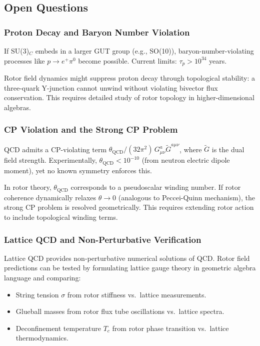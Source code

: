 \documentclass[11pt,a4paper]{article}
\theoremstyle{definition}
\theoremstyle{plain}
\theoremstyle{remark}
\begin{document}
\subsection{Open Questions}

\subsubsection{Proton Decay and Baryon Number Violation}

If SU(3)$_C$ embeds in a larger GUT group (e.g., SO(10)), baryon-number-violating processes like $p \to e^+ \pi^0$ become possible. Current limits: $\tau_p > 10^{34}$ years.

Rotor field dynamics might suppress proton decay through topological stability: a three-quark Y-junction cannot unwind without violating bivector flux conservation. This requires detailed study of rotor topology in higher-dimensional algebras.

\subsubsection{CP Violation and the Strong CP Problem}

QCD admits a CP-violating term $\theta_{\mathrm{QCD}}/(32\pi^2)\,G_{\mu\nu}^a \tilde{G}^{a\mu\nu}$, where $\tilde{G}$ is the dual field strength. Experimentally, $\theta_{\mathrm{QCD}} < 10^{-10}$ (from neutron electric dipole moment), yet no known symmetry enforces this.

In rotor theory, $\theta_{\mathrm{QCD}}$ corresponds to a pseudoscalar winding number. If rotor coherence dynamically relaxes $\theta \to 0$ (analogous to Peccei-Quinn mechanism), the strong CP problem is resolved geometrically. This requires extending rotor action to include topological winding terms.

\subsubsection{Lattice QCD and Non-Perturbative Verification}

Lattice QCD provides non-perturbative numerical solutions of QCD. Rotor field predictions can be tested by formulating lattice gauge theory in geometric algebra language and comparing:
\begin{itemize}
  \item String tension $\sigma$ from rotor stiffness vs.\ lattice measurements.
  \item Glueball masses from rotor flux tube oscillations vs.\ lattice spectra.
  \item Deconfinement temperature $T_c$ from rotor phase transition vs.\ lattice thermodynamics.
\end{itemize}
\end{document}
